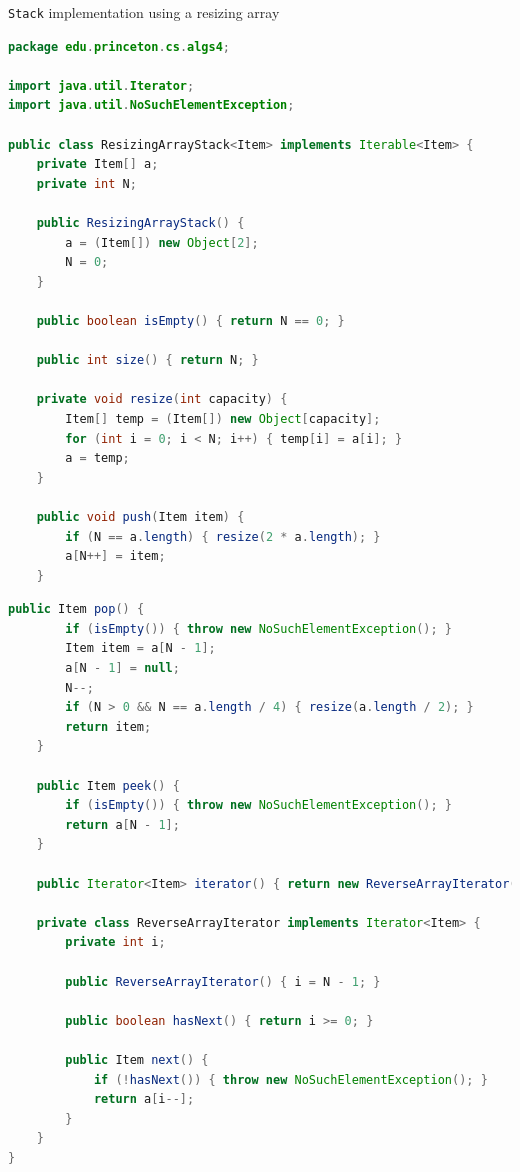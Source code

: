 \documentclass[8pt,a4paper,compress]{beamer}
\begin{document}
\begin{frame}[fragile]
\pause

\lstinline{Stack} implementation using a resizing array
\begin{lstlisting}[language=Java]
package edu.princeton.cs.algs4;

import java.util.Iterator;
import java.util.NoSuchElementException;

public class ResizingArrayStack<Item> implements Iterable<Item> {
    private Item[] a; 
    private int N; 
    
    public ResizingArrayStack() {
        a = (Item[]) new Object[2];
        N = 0;
    }

    public boolean isEmpty() { return N == 0; }

    public int size() { return N; }

    private void resize(int capacity) {
        Item[] temp = (Item[]) new Object[capacity];
        for (int i = 0; i < N; i++) { temp[i] = a[i]; }
        a = temp;
    }

    public void push(Item item) {
        if (N == a.length) { resize(2 * a.length); }
        a[N++] = item; 
    }
\end{lstlisting}
\end{frame}

\begin{frame}[fragile]
\pause

\begin{lstlisting}[language=Java]
    public Item pop() {
        if (isEmpty()) { throw new NoSuchElementException(); }
        Item item = a[N - 1];
        a[N - 1] = null; 
        N--;
        if (N > 0 && N == a.length / 4) { resize(a.length / 2); }
        return item;
    }

    public Item peek() {
        if (isEmpty()) { throw new NoSuchElementException(); }
        return a[N - 1];
    }

    public Iterator<Item> iterator() { return new ReverseArrayIterator(); }

    private class ReverseArrayIterator implements Iterator<Item> {
        private int i;

        public ReverseArrayIterator() { i = N - 1; }

        public boolean hasNext() { return i >= 0; }

        public Item next() {
            if (!hasNext()) { throw new NoSuchElementException(); }
            return a[i--];
        }
    }
}
\end{lstlisting}
\end{frame}
\end{document}
